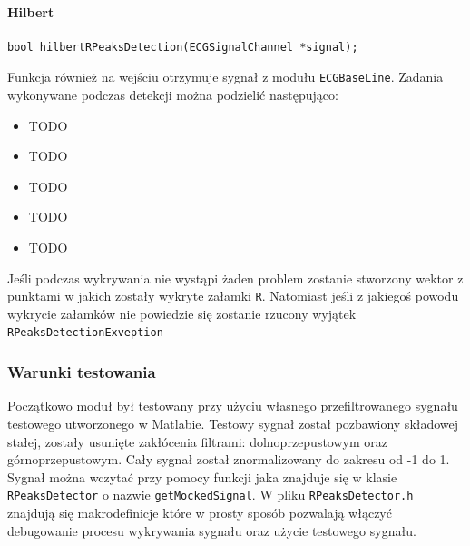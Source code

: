 \documentclass[a4paper, 11pt]{article}
\begin{document}
\paragraph{Hilbert}
\begin{lstlisting}
bool hilbertRPeaksDetection(ECGSignalChannel *signal);
\end{lstlisting}
Funkcja również na wejściu otrzymuje sygnał z modułu \verb|ECGBaseLine|. Zadania wykonywane podczas detekcji można podzielić następująco:
\begin{itemize}
	\item TODO
	\item TODO
	\item TODO
	\item TODO
	\item TODO
\end{itemize}
Jeśli podczas wykrywania nie wystąpi żaden problem zostanie stworzony wektor z punktami w jakich zostały wykryte załamki \verb|R|. Natomiast jeśli z jakiegoś powodu wykrycie załamków nie powiedzie się zostanie rzucony wyjątek \verb|RPeaksDetectionExveption|

\subsubsection{Warunki testowania}
\label{sec:rs:tests}
Początkowo moduł był testowany przy użyciu własnego przefiltrowanego sygnału testowego utworzonego w Matlabie. Testowy sygnał został pozbawiony składowej stałej, zostały usunięte zakłócenia filtrami: dolnoprzepustowym oraz górnoprzepustowym. Cały sygnał został znormalizowany do zakresu od -1 do 1.\\
\indent Sygnał można wczytać przy pomocy funkcji jaka znajduje się w klasie \verb|RPeaksDetector| o nazwie \verb|getMockedSignal|. W pliku \verb|RPeaksDetector.h| znajdują się makrodefinicje które w prosty sposób pozwalają włączyć debugowanie procesu wykrywania sygnału oraz użycie testowego sygnału.\\
\end{document}
